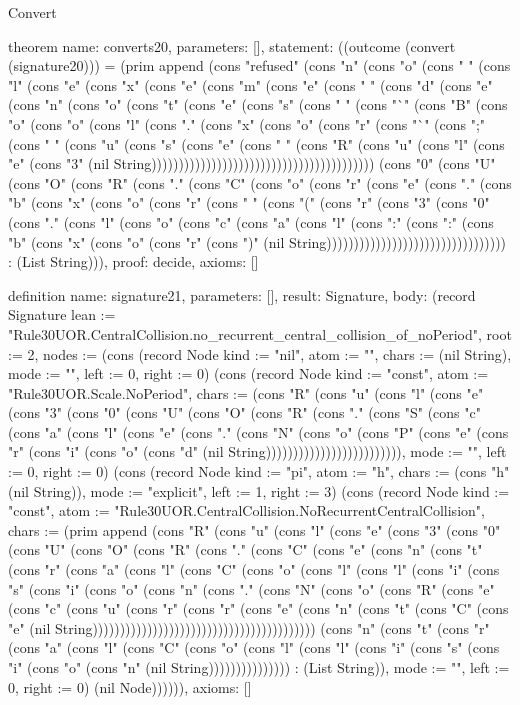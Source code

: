 \begin{lexlean}{Convert}
\begin{semanticmodule}
theorem{
  name: converts20,
  parameters: [],
  statement: ((outcome (convert (signature20))) = (prim append (cons "refused" (cons "n" (cons "o" (cons " " (cons "l" (cons "e" (cons "x" (cons "e" (cons "m" (cons "e" (cons " " (cons "d" (cons "e" (cons "n" (cons "o" (cons "t" (cons "e" (cons "s" (cons " " (cons "`" (cons "B" (cons "o" (cons "o" (cons "l" (cons "." (cons "x" (cons "o" (cons "r" (cons "`" (cons ";" (cons " " (cons "u" (cons "s" (cons "e" (cons " " (cons "R" (cons "u" (cons "l" (cons "e" (cons "3" (nil String))))))))))))))))))))))))))))))))))))))))) (cons "0" (cons "U" (cons "O" (cons "R" (cons "." (cons "C" (cons "o" (cons "r" (cons "e" (cons "." (cons "b" (cons "x" (cons "o" (cons "r" (cons " " (cons "(" (cons "r" (cons "3" (cons "0" (cons "." (cons "l" (cons "o" (cons "c" (cons "a" (cons "l" (cons ":" (cons ":" (cons "b" (cons "x" (cons "o" (cons "r" (cons ")" (nil String))))))))))))))))))))))))))))))))) : (List String))),
  proof: decide{},
  axioms: []
}

definition{
  name: signature21,
  parameters: [],
  result: Signature,
  body: (record Signature {lean := "Rule30UOR.CentralCollision.no_recurrent_central_collision_of_noPeriod", root := 2, nodes := (cons (record Node {kind := "nil", atom := "", chars := (nil String), mode := "", left := 0, right := 0}) (cons (record Node {kind := "const", atom := "Rule30UOR.Scale.NoPeriod", chars := (cons "R" (cons "u" (cons "l" (cons "e" (cons "3" (cons "0" (cons "U" (cons "O" (cons "R" (cons "." (cons "S" (cons "c" (cons "a" (cons "l" (cons "e" (cons "." (cons "N" (cons "o" (cons "P" (cons "e" (cons "r" (cons "i" (cons "o" (cons "d" (nil String))))))))))))))))))))))))), mode := "", left := 0, right := 0}) (cons (record Node {kind := "pi", atom := "h", chars := (cons "h" (nil String)), mode := "explicit", left := 1, right := 3}) (cons (record Node {kind := "const", atom := "Rule30UOR.CentralCollision.NoRecurrentCentralCollision", chars := (prim append (cons "R" (cons "u" (cons "l" (cons "e" (cons "3" (cons "0" (cons "U" (cons "O" (cons "R" (cons "." (cons "C" (cons "e" (cons "n" (cons "t" (cons "r" (cons "a" (cons "l" (cons "C" (cons "o" (cons "l" (cons "l" (cons "i" (cons "s" (cons "i" (cons "o" (cons "n" (cons "." (cons "N" (cons "o" (cons "R" (cons "e" (cons "c" (cons "u" (cons "r" (cons "r" (cons "e" (cons "n" (cons "t" (cons "C" (cons "e" (nil String))))))))))))))))))))))))))))))))))))))))) (cons "n" (cons "t" (cons "r" (cons "a" (cons "l" (cons "C" (cons "o" (cons "l" (cons "l" (cons "i" (cons "s" (cons "i" (cons "o" (cons "n" (nil String))))))))))))))) : (List String)), mode := "", left := 0, right := 0}) (nil Node)))))}),
  axioms: []
}


\end{semanticmodule}
\end{lexlean}
